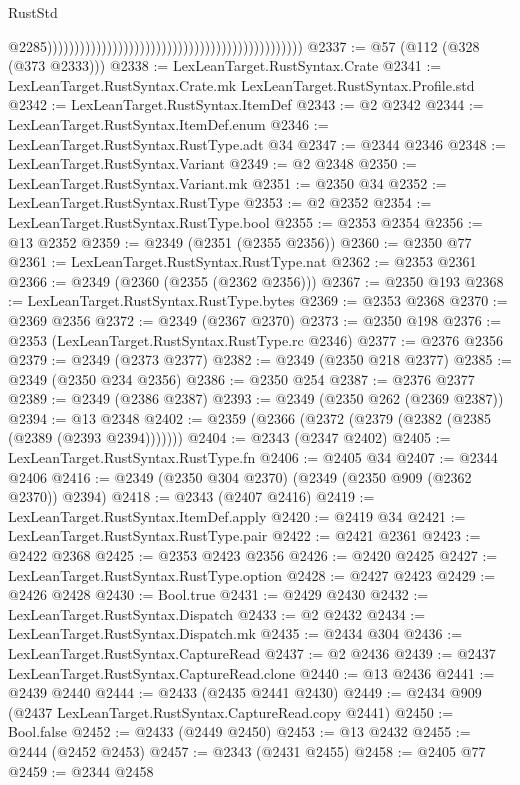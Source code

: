 \begin{lexlean}{RustStd}
\begin{coremodule}
                                                                                                  @2285)))))))))))))))))))))))))))))))))))))))))))))))
@2337 := @57 (@112 (@328 (@373 @2333)))
@2338 := LexLeanTarget.RustSyntax.Crate
@2341 := LexLeanTarget.RustSyntax.Crate.mk LexLeanTarget.RustSyntax.Profile.std
@2342 := LexLeanTarget.RustSyntax.ItemDef
@2343 := @2 @2342
@2344 := LexLeanTarget.RustSyntax.ItemDef.enum
@2346 := LexLeanTarget.RustSyntax.RustType.adt @34
@2347 := @2344 @2346
@2348 := LexLeanTarget.RustSyntax.Variant
@2349 := @2 @2348
@2350 := LexLeanTarget.RustSyntax.Variant.mk
@2351 := @2350 @34
@2352 := LexLeanTarget.RustSyntax.RustType
@2353 := @2 @2352
@2354 := LexLeanTarget.RustSyntax.RustType.bool
@2355 := @2353 @2354
@2356 := @13 @2352
@2359 := @2349 (@2351 (@2355 @2356))
@2360 := @2350 @77
@2361 := LexLeanTarget.RustSyntax.RustType.nat
@2362 := @2353 @2361
@2366 := @2349 (@2360 (@2355 (@2362 @2356)))
@2367 := @2350 @193
@2368 := LexLeanTarget.RustSyntax.RustType.bytes
@2369 := @2353 @2368
@2370 := @2369 @2356
@2372 := @2349 (@2367 @2370)
@2373 := @2350 @198
@2376 := @2353 (LexLeanTarget.RustSyntax.RustType.rc @2346)
@2377 := @2376 @2356
@2379 := @2349 (@2373 @2377)
@2382 := @2349 (@2350 @218 @2377)
@2385 := @2349 (@2350 @234 @2356)
@2386 := @2350 @254
@2387 := @2376 @2377
@2389 := @2349 (@2386 @2387)
@2393 := @2349 (@2350 @262 (@2369 @2387))
@2394 := @13 @2348
@2402 := @2359 (@2366 (@2372 (@2379 (@2382 (@2385 (@2389 (@2393 @2394)))))))
@2404 := @2343 (@2347 @2402)
@2405 := LexLeanTarget.RustSyntax.RustType.fn
@2406 := @2405 @34
@2407 := @2344 @2406
@2416 := @2349 (@2350 @304 @2370) (@2349 (@2350 @909 (@2362 @2370)) @2394)
@2418 := @2343 (@2407 @2416)
@2419 := LexLeanTarget.RustSyntax.ItemDef.apply
@2420 := @2419 @34
@2421 := LexLeanTarget.RustSyntax.RustType.pair
@2422 := @2421 @2361
@2423 := @2422 @2368
@2425 := @2353 @2423 @2356
@2426 := @2420 @2425
@2427 := LexLeanTarget.RustSyntax.RustType.option
@2428 := @2427 @2423
@2429 := @2426 @2428
@2430 := Bool.true
@2431 := @2429 @2430
@2432 := LexLeanTarget.RustSyntax.Dispatch
@2433 := @2 @2432
@2434 := LexLeanTarget.RustSyntax.Dispatch.mk
@2435 := @2434 @304
@2436 := LexLeanTarget.RustSyntax.CaptureRead
@2437 := @2 @2436
@2439 := @2437 LexLeanTarget.RustSyntax.CaptureRead.clone
@2440 := @13 @2436
@2441 := @2439 @2440
@2444 := @2433 (@2435 @2441 @2430)
@2449 := @2434 @909 (@2437 LexLeanTarget.RustSyntax.CaptureRead.copy @2441)
@2450 := Bool.false
@2452 := @2433 (@2449 @2450)
@2453 := @13 @2432
@2455 := @2444 (@2452 @2453)
@2457 := @2343 (@2431 @2455)
@2458 := @2405 @77
@2459 := @2344 @2458

\end{coremodule}
\end{lexlean}
